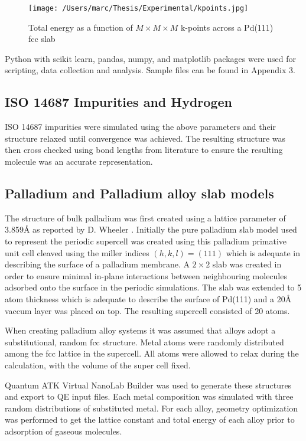 \begin{figure}
  \centering
  \texttt{[image: /Users/marc/Thesis/Experimental/kpoints.jpg]}
  \caption{Total energy as a function of $M\times M\times M$ k-points across a Pd(111) fcc slab}
  \label{kpoints}
\end{figure}

Python with scikit learn, pandas, numpy, and matplotlib packages were used for scripting, data collection and analysis. Sample files can be found in Appendix 3. 

\subsection{ISO 14687 Impurities and Hydrogen} \label{gassim}
ISO 14687 impurities were simulated using the above parameters and their structure relaxed until convergence was achieved. The resulting structure was then cross checked using bond lengths from literature to ensure the resulting molecule was an accurate representation. 

\subsection{Palladium and Palladium alloy slab models}\label{slabsim}
The structure of bulk palladium was first created using a lattice parameter of 3.859\si{\angstrom} as reported by D. Wheeler \cite{PhysRev.25.753}. Initially the pure palladium slab model used to represent the periodic supercell was created using this palladium primative unit cell cleaved using the miller indices $(h,k,l) = (111)$ which is adequate in describing the surface of a palladium membrane. A $2\times 2$ slab was created in order to ensure minimal in-plane interactions between neighbouring molecules adsorbed onto the surface in the periodic simulations. The slab was extended to 5 atom thickness which is adequate to describe the surface of Pd(111) and a 20\si{\angstrom} vaccum layer was placed on top. The resulting supercell consisted of 20 atoms. 

When creating palladium alloy systems it was assumed that alloys adopt a substitutional, random fcc structure. Metal atoms were randomly distributed among the fcc lattice in the supercell. All atoms were allowed to relax during the calculation, with the volume of the super cell fixed. 

Quantum ATK Virtual NanoLab Builder \cite{synopsys} was used to generate these structures and export to QE input files. Each metal composition was simulated with three random distributions of substituted metal. For each alloy, geometry optimization was performed to get the lattice constant and total energy of each alloy prior to adsorption of gaseous molecules.


